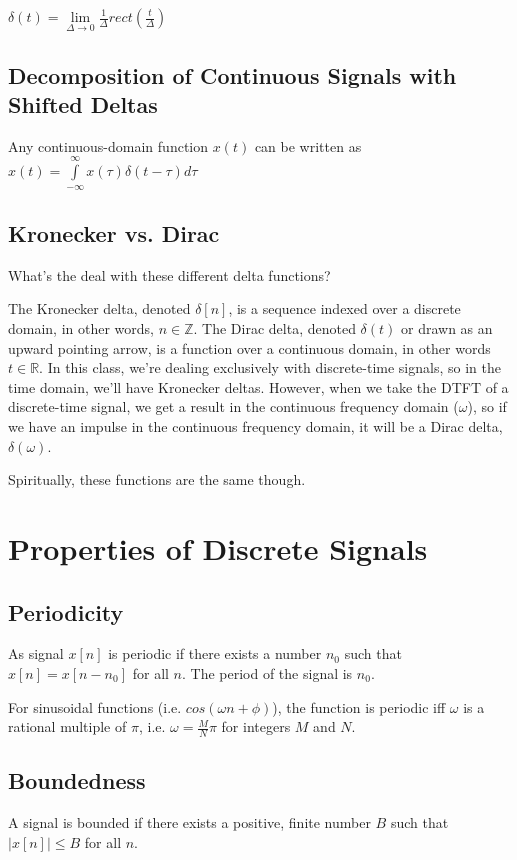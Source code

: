 \documentclass[11pt]{article}
\begin{document}
$\delta(t) = \lim\limits_{\Delta\rightarrow 0} \frac{1}{\Delta} rect(\frac{t}{\Delta})$

\subsection{Decomposition of Continuous Signals with Shifted Deltas}
Any continuous-domain function $x(t)$ can be written as $x(t)=\int\limits_{-\infty}^\infty x(\tau)\delta(t-\tau)d\tau$


\subsection{Kronecker vs. Dirac}

What's the deal with these different delta functions? 

The Kronecker delta, denoted $\delta[n]$, is a sequence indexed over a discrete domain, in other words, $n \in \mathbb{Z}$. The Dirac delta, denoted $\delta(t)$ or drawn as an upward pointing arrow, is a function over a continuous domain, in other words $t \in \mathbb{R}$. In this class, we're dealing exclusively with discrete-time signals, so in the time domain, we'll have Kronecker deltas. However, when we take the DTFT of a discrete-time signal, we get a result in the continuous frequency domain ($\omega$), so if we have an impulse in the continuous frequency domain, it will be a Dirac delta, $\delta(\omega)$.

Spiritually, these functions are the same though. 


\section{Properties of Discrete Signals}

\subsection{Periodicity}
As signal $x[n]$ is periodic if there exists a number $n_0$ such that $x[n]=x[n-n_0]$ for all $n$. The period of the signal is $n_0$.

For sinusoidal functions (i.e. $cos\left(\omega n + \phi\right)$), the function is periodic iff $\omega$ is a rational multiple of $\pi$, i.e. $\omega = \frac{M}{N}\pi$ for integers $M$ and $N$.

\subsection{Boundedness}
A signal is bounded if there exists a positive, finite number $B$ such that $|x[n]|  \leq B$ for all $n$. 
\end{document}
